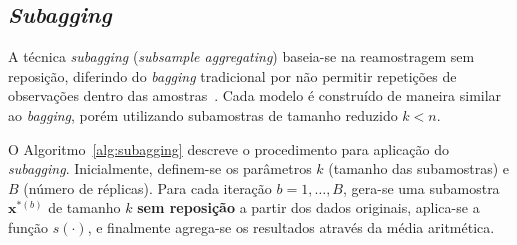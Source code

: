 \subsection{\textit{Subagging}}
\label{sec:subagging}

A técnica \textit{subagging} (\textit{subsample aggregating}) baseia-se na reamostragem sem reposição, diferindo do \textit{bagging} tradicional por não permitir repetições de observações dentro das amostras~\cite{GALVAO:2006,Buhlmann2003,revelas2024,qin2023,zhaoY2018,shi2021,zhang2017,Tao2021,paleologo2020,wei2021}. Cada modelo é construído de maneira similar ao \textit{bagging}, porém utilizando subamostras de tamanho reduzido $k < n$.

\begin{center}
\begin{minipage}{0.85\textwidth}
\centering %
\end{minipage}
\end{center}

\medskip

O Algoritmo~\ref{alg:subagging} descreve o procedimento para aplicação do \textit{subagging}. Inicialmente, definem-se os parâmetros $k$ (tamanho das subamostras) e $B$ (número de réplicas). Para cada iteração $b = 1, \ldots, B$, gera-se uma subamostra $\mathbf{x}^{*(b)}$ de tamanho $k$ \textbf{sem reposição} a partir dos dados originais, aplica-se a função $s(\cdot)$, e finalmente agrega-se os resultados através da média aritmética.

